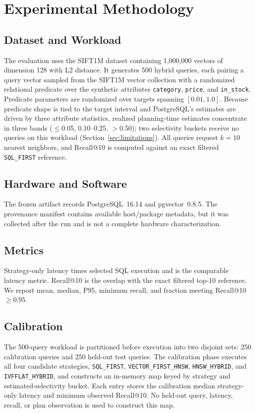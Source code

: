 \documentclass[conference]{IEEEtran}
\begin{document}
\section{Experimental Methodology}
\subsection{Dataset and Workload}
The evaluation uses the SIFT1M dataset containing 1,000,000 vectors of dimension 128 with L2 distance. It generates 500 hybrid queries, each pairing a query vector sampled from the SIFT1M vector collection with a randomized relational predicate over the synthetic attributes \texttt{category}, \texttt{price}, and \texttt{in\_stock}. Predicate parameters are randomized over targets spanning $[0.01,1.0]$. Because predicate shape is tied to the target interval and PostgreSQL's estimates are driven by three attribute statistics, realized planning-time estimates concentrate in three bands ($\leq$0.05, 0.10--0.25, $>$0.50); two selectivity buckets receive no queries on this workload (Section~\ref{sec:limitations}). All queries request $k=10$ nearest neighbors, and Recall@10 is computed against an exact filtered \texttt{SQL\_FIRST} reference.

\subsection{Hardware and Software}
The frozen artifact records PostgreSQL~16.14 and pgvector~0.8.5. The provenance manifest contains available host/package metadata, but it was collected after the run and is not a complete hardware characterization.

\subsection{Metrics}
Strategy-only latency times selected SQL execution and is the comparable latency metric. Recall@10 is the overlap with the exact filtered top-10 reference. We report mean, median, P95, minimum recall, and fraction meeting Recall@10 $\geq0.95$.

\subsection{Calibration}
The 500-query workload is partitioned before execution into two disjoint sets: 250 calibration queries and 250 held-out test queries. The calibration phase executes all four candidate strategies, \texttt{SQL\_FIRST}, \texttt{VECTOR\_FIRST\_HNSW}, \texttt{HNSW\_HYBRID}, and \texttt{IVFFLAT\_HYBRID}, and constructs an in-memory map keyed by strategy and estimated-selectivity bucket. Each entry stores the calibration median strategy-only latency and minimum observed Recall@10. No held-out query, latency, recall, or plan observation is used to construct this map.
\end{document}
